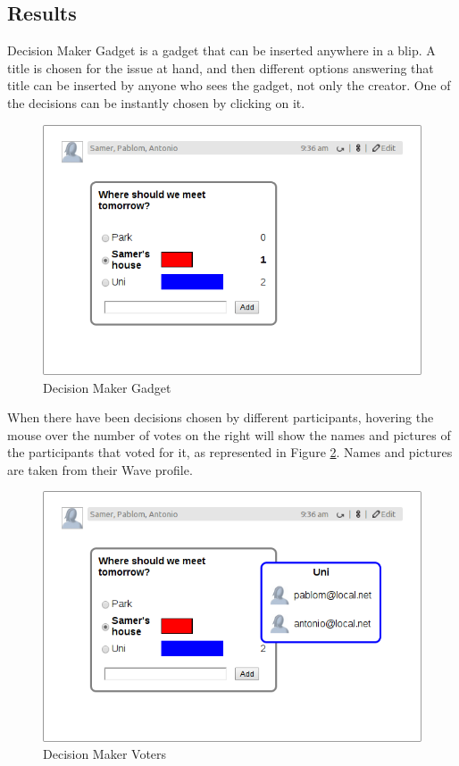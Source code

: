 \subsection{Results}
Decision Maker Gadget is a gadget that can be inserted anywhere in a blip. A title is chosen for the issue at hand, and then different options answering that title can be inserted by anyone who sees the gadget, not only the creator. One of the decisions can be instantly chosen by clicking on it.\\[.2cm]
\begin{figure}[h]
  \center
    \includegraphics[keepaspectratio, scale=0.4]{Media/Captures/Extensions/DecisionMakerGadget.png}
  \caption{Decision Maker Gadget}
  \label{fig:decision_maker_gadget}
\end{figure}
When there have been decisions chosen by different participants, hovering the mouse over the number of votes on the right will show the names and pictures of the participants that voted for it, as represented in Figure \ref{fig:decision_maker_votes}. Names and pictures are taken from their Wave profile.\\[.2cm]
\begin{figure}[h]
  \center
    \includegraphics[keepaspectratio, scale=0.4]{Media/Captures/Extensions/DecisionMakerGadget_votes.png}
  \caption{Decision Maker Voters}
  \label{fig:decision_maker_votes}
\end{figure}

